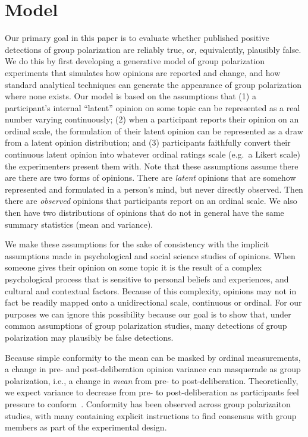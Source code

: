 \section{Model}

Our primary goal in this paper is to evaluate whether published positive
detections of group polarization are reliably true, or, equivalently, plausibly false. 
We do this by first developing a generative model of group polarization 
experiments that simulates how opinions are reported and change, and
how standard analytical techniques can generate the appearance of group
polarization where none exists.
Our model is based on the assumptions that (1) a 
participant's internal ``latent'' opinion on some topic can be represented as a real number
varying continuously; (2) when a participant reports their 
opinion on an ordinal scale, the formulation
of their latent opinion can be represented as a draw from a latent opinion distribution; 
and (3) participants faithfully convert their continuous latent
opinion into whatever ordinal ratings scale (e.g.\ a Likert scale) 
the experimenters present them with. 
Note that these assumptions assume there are there are two forms of opinions. 
There are \emph{latent} opinions that are somehow represented and formulated in a 
person's mind, but never directly observed. Then there are \emph{observed}
opinions that participants report on an ordinal scale. We also then have two
distributions of opinions that do not in general have the same summary statistics (mean
and variance).

We make these assumptions for the sake of consistency with 
the implicit assumptions made in psychological and social science studies of
opinions. When someone gives their opinion
on some topic it is the result of a complex psychological process that is
sensitive to personal beliefs and experiences, and cultural and contextual factors.
Because of this complexity, opinions may not in fact be readily mapped onto a 
unidirectional scale, continuous or ordinal. For our purposes we can ignore
this possibility because our goal is to show that, under common assumptions 
of group polarization studies, many detections of group polarization 
may plausibly be false detections.

Because simple conformity to the mean can be masked by ordinal measurements,
a change in pre- and post-deliberation opinion variance can masquerade as 
group polarization, i.e., a change in \emph{mean} from pre- to post-deliberation.
Theoretically, we expect variance to decrease from pre- to post-deliberation
as participants feel pressure to 
conform~\cite{Asch1951,Asch1955,French1956,DeGroot1974,Lorenz2009}. 
Conformity has been observed across group polarizaiton studies, with
many containing explicit instructions to find consensus with group
members as part of the experimental design.


